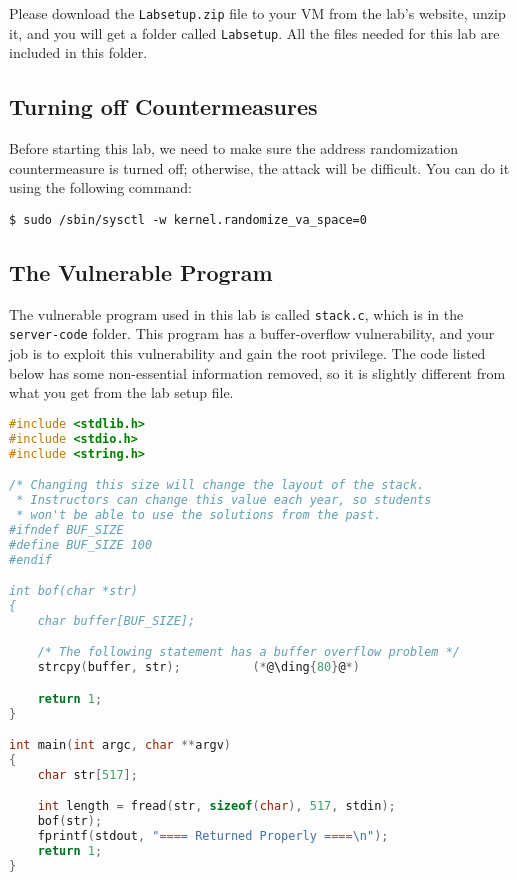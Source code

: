 Please download the \texttt{Labsetup.zip} file to your VM from the lab’s website, 
unzip it, and you will get a folder called \texttt{Labsetup}. All the files 
needed for this lab are included in this folder.


\subsection{Turning off Countermeasures} 

Before starting this lab, we need to make sure the 
address randomization countermeasure is turned off; otherwise, the 
attack will be difficult. 
You can do it using the following command:

\begin{lstlisting}
$ sudo /sbin/sysctl -w kernel.randomize_va_space=0
\end{lstlisting}
 

\subsection{The Vulnerable Program} 
\label{sec:vulnerable_program}

The vulnerable program used in this lab is called
\texttt{stack.c}, which is in the \texttt{server-code} folder.
This program has a buffer-overflow vulnerability,
and your job is to exploit this vulnerability and gain the root privilege.
The code listed below has some non-essential information removed,
so it is slightly different from what you get from the lab setup file.

\begin{lstlisting}[language=C, caption={The vulnerable program \texttt{stack.c}}]
#include <stdlib.h>
#include <stdio.h>
#include <string.h>

/* Changing this size will change the layout of the stack.
 * Instructors can change this value each year, so students
 * won't be able to use the solutions from the past.
#ifndef BUF_SIZE
#define BUF_SIZE 100
#endif

int bof(char *str)
{
    char buffer[BUF_SIZE];

    /* The following statement has a buffer overflow problem */ 
    strcpy(buffer, str);          (*@\ding{80}@*)

    return 1;
}

int main(int argc, char **argv)
{
    char str[517];

    int length = fread(str, sizeof(char), 517, stdin);
    bof(str);
    fprintf(stdout, "==== Returned Properly ====\n");
    return 1;
}
\end{lstlisting}

